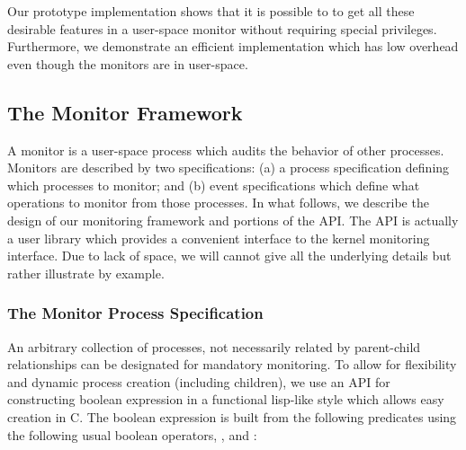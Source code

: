 Our prototype implementation shows that it is possible to to get all
these desirable features in a user-space monitor without requiring special
privileges. Furthermore, we demonstrate an efficient implementation
which has low overhead even though the monitors are in user-space.


\subsection{The Monitor Framework}
\label{sec:lbox-framework}

A monitor is a user-space process which audits the behavior of other processes.
Monitors are described by two specifications:
(a) a process specification defining which processes to monitor; and
(b) event specifications which define what operations to monitor from
those processes.
In what follows, we describe the design of our monitoring framework and
portions of the API. The API is actually a user library which provides
a convenient interface to the kernel monitoring interface.
Due to lack of space, we will cannot give all the underlying
details but rather illustrate by example.

\subsubsection{The Monitor Process Specification}

An arbitrary collection of processes, not necessarily related by parent-child
relationships can be designated for mandatory monitoring.
To allow for flexibility and dynamic process creation (including children),
we use an API for constructing boolean expression in a functional lisp-like
style which allows easy creation in C.
The boolean expression is built from the following predicates using
the following usual boolean operators, ,  and :


